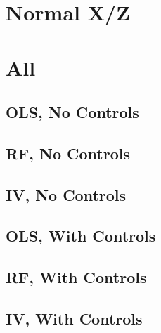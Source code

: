 \documentclass{article}
\begin{document}
\begin{landscape}
\section{Normal X/Z}
\section{All}
\subsection{OLS, No Controls}

\clearpage
\subsection{RF, No Controls}

\clearpage
\subsection{IV, No Controls}

\clearpage

\subsection{OLS, With Controls}

\clearpage
\subsection{RF, With Controls}

\clearpage
\subsection{IV, With Controls}

\clearpage


\clearpage

\clearpage
%
%
%
%
%
%
%
%
%

\end{landscape}
\end{document}
